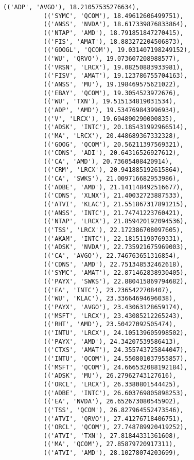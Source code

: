 \documentclass[11pt]{article}
\begin{document}
\begin{Verbatim}[commandchars=\\\{\}]
           (('ADP', 'AVGO'), 18.21057535276634),
           (('SYMC', 'QCOM'), 18.49612606499751),
           (('ANSS', 'NVDA'), 18.617339876833864),
           (('NTAP', 'AMD'), 18.791851847270415),
           (('FIS', 'AMAT'), 18.883272204506873),
           (('GOOGL', 'QCOM'), 19.031407198249152),
           (('WU', 'QRVO'), 19.073607208988577),
           (('VRSN', 'LRCX'), 19.08250883933981),
           (('FISV', 'AMAT'), 19.123786755704163),
           (('ANSS', 'MU'), 19.198469575621022),
           (('EBAY', 'QCOM'), 19.3054523972676),
           (('WU', 'TXN'), 19.515134819031534),
           (('ADP', 'AMD'), 19.534769843996934),
           (('V', 'LRCX'), 19.694890290000835),
           (('ADSK', 'INTC'), 20.185431992966514),
           (('MA', 'LRCX'), 20.448689367332328),
           (('GOOG', 'QCOM'), 20.56211397569321),
           (('CDNS', 'ADI'), 20.64316526927612),
           (('CA', 'AMD'), 20.73605408420914),
           (('CRM', 'LRCX'), 20.941885192615864),
           (('CA', 'SWKS'), 21.009716682953986),
           (('ADBE', 'AMD'), 21.141148492516677),
           (('CDNS', 'XLNX'), 21.40032723887533),
           (('ATVI', 'KLAC'), 21.551867317891215),
           (('ANSS', 'INTC'), 21.74741223760421),
           (('NTAP', 'LRCX'), 21.859420192094536),
           (('TSS', 'LRCX'), 22.172386708097605),
           (('AKAM', 'INTC'), 22.18151190769331),
           (('ADSK', 'NVDA'), 22.735921675969003),
           (('CA', 'AVGO'), 22.746763651316854),
           (('CDNS', 'AMD'), 22.751348532462618),
           (('SYMC', 'AMAT'), 22.871462838930405),
           (('PAYX', 'SWKS'), 22.880415869794682),
           (('EA', 'INTC'), 23.2365422708407),
           (('WU', 'KLAC'), 23.33664694696038),
           (('PAYX', 'AVGO'), 23.43063128659174),
           (('MSFT', 'LRCX'), 23.43085212265243),
           (('RHT', 'AMD'), 23.50427092505474),
           (('INTU', 'LRCX'), 24.105139605998502),
           (('PAYX', 'AMD'), 24.34207539586413),
           (('CTXS', 'AMAT'), 24.355743725844047),
           (('INTU', 'QCOM'), 24.550801037955857),
           (('MSFT', 'QCOM'), 24.666532088192184),
           (('ADSK', 'MU'), 26.27962743127616),
           (('ORCL', 'LRCX'), 26.3380801544425),
           (('ADBE', 'INTC'), 26.603769805898253),
           (('EA', 'NVDA'), 26.652673080545902),
           (('TSS', 'QCOM'), 26.827964552473546),
           (('ATVI', 'QRVO'), 27.41276718406751),
           (('ORCL', 'QCOM'), 27.748789920419252),
           (('ATVI', 'TXN'), 27.81844331361608),
           (('MA', 'QCOM'), 27.85879720917311),
           (('ATVI', 'AMD'), 28.10278074203699),

\end{Verbatim}
\end{document}
